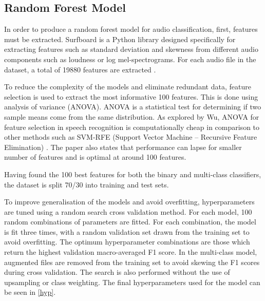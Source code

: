 \documentclass[conference]{IEEEtran}
\begin{document}
\subsection{Random Forest Model}
In order to produce a random forest model for audio classification, first, features must be extracted. Surfboard is a Python library designed specifically for extracting features such as standard deviation and skewness from different audio components such as loudness or log mel-spectrograms. For each audio file in the dataset, a total of 19880 features are extracted \cite{surfboard}. 

To reduce the complexity of the models and eliminate redundant data, feature selection is used to extract the most informative 100 features. This is done using analysis of variance (ANOVA). ANOVA is a statistical test for determining if two sample means come from the same distribution. As explored by Wu, ANOVA for feature selection in speech recognition is computationally cheap in comparison to other methods such as SVM-RFE (Support Vector Machine – Recursive Feature Elimination) \cite{featselectionWU}. The paper also states that performance can lapse for smaller number of features and is optimal at around 100 features.

Having found the 100 best features for both the binary and multi-class classifiers, the dataset is split 70/30 into training and test sets.

To improve generalisation of the models and avoid overfitting, hyperparameters are tuned using a random search cross validation method. For each model, 100 random combinations of parameters are fitted. For each combination, the model is fit three times, with a random validation set drawn from the training set to avoid overfitting. The optimum hyperparameter combinations are those which return the highest validation macro-averaged F1 score. In the multi-class model, augmented files are removed from the training set to avoid skewing the F1 scores during cross validation. The search is also performed without the use of upsampling or class weighting. The final hyperparameters used for the model can be seen in \autoref{hyp}.

\end{document}
